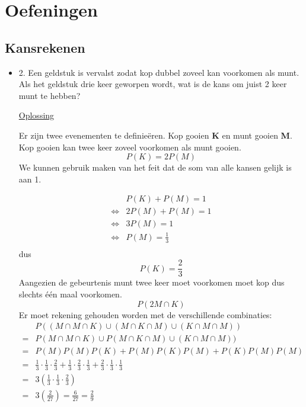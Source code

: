\documentclass[12pt]{report}
\newcommand{\exercise}[2]{
  #1
  

  \underline{Oplossing}
  
  #2
  
    \hrulefill
}
\begin{document}
\part{Oefeningen}
\chapter{Kansrekenen}
  
\begin{itemize}[label={}, leftmargin=*]
	\item {\exercise{2. Een geldstuk is vervalst zodat kop dubbel zoveel kan voorkomen als munt. Als het geldstuk drie keer geworpen wordt, wat is de kans om juist 2 keer munt te hebben?}{
		Er zijn twee evenementen te definieëren. Kop gooien \textbf{K} en munt gooien \textbf{M}. Kop gooien kan twee keer zoveel voorkomen als munt gooien.
		$$P(K) = 2P(M)$$
		We kunnen gebruik maken van het feit dat de som van alle kansen gelijk is aan 1.
		
		
		\begin{equation*}
			\begin{split}
				&  P(K) + P(M) = 1    \\
				\Leftrightarrow & 2P(M) + P(M) = 1    \\
				\Leftrightarrow & 3P(M) = 1           \\
				\Leftrightarrow & P(M) = \frac{1}{3}  \\
			\end{split}
		\end{equation*}
		dus
		$$P(K) = \frac{2}{3}$$
		Aangezien de gebeurtenis munt twee keer moet voorkomen moet kop dus slechts één maal voorkomen.
		$$P(2M \cap K)$$
		Er moet rekening gehouden worden met de verschillende combinaties:
		\begin{equation*}
			\begin{split}
				& P((M \cap M \cap K) \cup (M \cap K \cap M) \cup (K \cap M \cap M))  \\
				= & P(M \cap M \cap K) \cup P(M \cap K \cap M) \cup (K \cap M \cap M)) \\
				= & P(M)P(M)P(K) + P(M)P(K)P(M) + P(K)P(M)P(M) \\
				= & \frac{1}{3} \cdot \frac{1}{3} \cdot \frac{2}{3} + \frac{1}{3} \cdot \frac{2}{3} \cdot \frac{1}{3} + \frac{2}{3} \cdot \frac{1}{3} \cdot \frac{1}{3} \\
				= & 3(\frac{1}{3} \cdot \frac{1}{3} \cdot \frac{2}{3}) \\
				= & 3(\frac{2}{27}) = \frac{6}{27} = \frac{2}{9} 
			\end{split}
		\end{equation*}
	}}
	    

\end{itemize}
\end{document}
